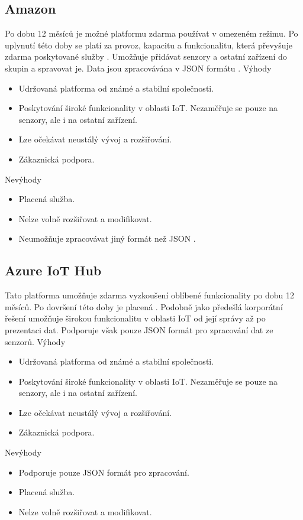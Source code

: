 \documentclass[thesis=M,czech]{FITthesis}[2018/10/20]
\begin{document}
\subsection{Amazon}
Po dobu 12 měsíců je možné platformu zdarma používat v omezeném režimu. Po uplynutí této doby se platí za provoz, kapacitu a funkcionalitu, která převyšuje zdarma poskytované služby \cite{aws}. Umožňuje přidávat senzory a ostatní zařízení do skupin a spravovat je. Data jsou zpracovávána v JSON formátu \cite{aws-works}.
\bigbreak
Výhody
\begin{itemize}
 \item Udržovaná platforma od známé a stabilní společnosti.
 \item Poskytování široké funkcionality v oblasti IoT. Nezaměřuje se pouze na senzory, ale i na ostatní zařízení.
 \item Lze očekávat neustálý vývoj a rozšiřování.
 \item Zákaznická podpora.
\end{itemize}
\bigbreak
Nevýhody
\begin{itemize}
 \item Placená služba.
 \item Nelze volně rozšiřovat a modifikovat.
 \item Neumožňuje zpracovávat jiný formát než JSON \cite{aws-works}.
\end{itemize}

\newpage

\subsection{Azure IoT Hub}
Tato platforma umožňuje zdarma vyzkoušení oblíbené funkcionality po dobu 12 měsíců. Po dovršení této doby je placená \cite{azure}. Podobně jako předešlá korporátní řešení umožňuje širokou funkcionalitu v oblasti IoT od její správy až po prezentaci dat. Podporuje však pouze JSON formát pro zpracování dat ze senzorů.
\bigbreak
Výhody
\begin{itemize}
 \item Udržovaná platforma od známé a stabilní společnosti.
 \item Poskytování široké funkcionality v oblasti IoT. Nezaměřuje se pouze na senzory, ale i na ostatní zařízení.
 \item Lze očekávat neustálý vývoj a rozšiřování.
 \item Zákaznická podpora.
\end{itemize}
\bigbreak
Nevýhody
\begin{itemize}
 \item Podporuje pouze JSON formát pro zpracování.
 \item Placená služba.
 \item Nelze volně rozšiřovat a modifikovat.
\end{itemize}
\end{document}
